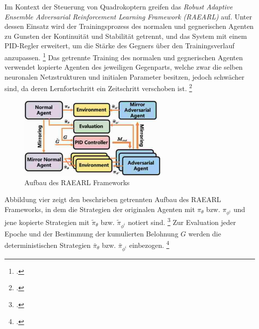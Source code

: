 Im Kontext der Steuerung von Quadrokoptern greifen \cite[]{Zhai.2022} das \textit{Robust Adaptive Ensemble Adversarial Reinforcement Learning Framework (RAEARL)} auf.
Unter dessen Einsatz wird der Trainingsprozess des normalen und gegnerischen Agenten zu Gunsten der Kontinuität und Stabilität getrennt, und das System mit einem PID-Regler erweitert, um die Stärke des Gegners über den Trainingsverlauf anzupassen. \footcite[Vgl.][S. 2]{Zhai.2022}
Das getrennte Training des normalen und gegnerischen Agenten verwendet kopierte Agenten des jeweiligen Gegenparts, welche zwar die selben neuronalen Netzstrukturen und initialen Parameter besitzen, jedoch schwächer sind, da deren Lernfortschritt ein Zeitschritt verschoben ist. \footcite[Vgl.][S. 2f.]{Zhai.2022}

\begin{figure}[htb]
    \centering
    \includegraphics[height=4cm]{lib/graphics/RAEARL Framework.png}
    \caption[Aufbau des RAEARL Frameworks]{Aufbau des RAEARL Frameworks\footnotemark}
    \label{abb:RAEARL}
\end{figure}

Abbildung vier zeigt den beschrieben getrennten Aufbau des RAEARL Frameworks, in dem die Strategien der originalen Agenten mit $\pi_{\theta}$ bzw. $\pi_{\phi^{i}}$ und jene kopierte Strategien mit $\widetilde{\pi}_{\theta}$ bzw. $\widetilde{\pi}_{\phi^{i}}$ notiert sind. \footcite[Vgl.][S. 3]{Zhai.2022}
Zur Evaluation jeder Epoche und der Bestimmung der kumulierten Belohnung $G$ werden die deterministischen Strategien $\bar{\pi}_{\theta}$ bzw. $\bar{\pi}_{\phi^{i}}$ einbezogen. \footcite[Vgl.][S.3]{Zhai.2022}